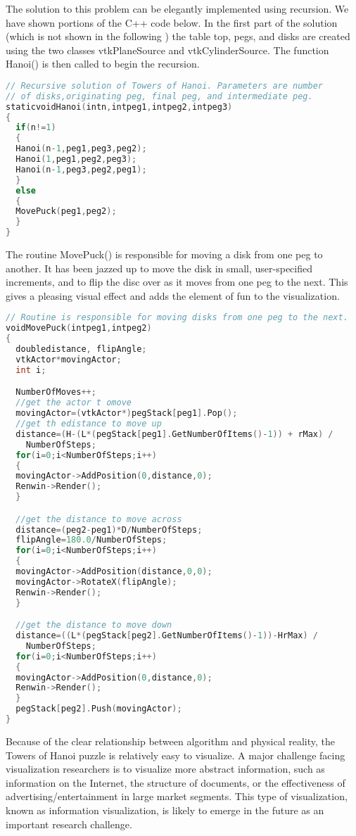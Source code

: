 The solution to this problem can be elegantly implemented using recursion. We have shown portions of the C++ code below.
In the first part of the solution (which is not shown in the following ) the table top, pegs, and disks are created using the two classes vtkPlaneSource and vtkCylinderSource. The function Hanoi() is then called to begin the recursion.

\begin{lstlisting}[language=C++, caption={Recursive solution for the Towers of Hanoi.}]
// Recursive solution of Towers of Hanoi. Parameters are number
// of disks,originating peg, final peg, and intermediate peg.
staticvoidHanoi(intn,intpeg1,intpeg2,intpeg3)
{
  if(n!=1)
  {
  Hanoi(n-1,peg1,peg3,peg2);
  Hanoi(1,peg1,peg2,peg3);
  Hanoi(n-1,peg3,peg2,peg1);
  }
  else
  {
  MovePuck(peg1,peg2);
  }
}
\end{lstlisting}

The routine MovePuck() is responsible for moving a disk from one peg to another. It has been jazzed up to move the disk in small, user-specified increments, and to flip the disc over as it moves from one peg to the next. This gives a pleasing visual effect and adds the element of fun to the visualization.

\begin{lstlisting}[language=C++, caption={Moving the puck.}]
// Routine is responsible for moving disks from one peg to the next.
voidMovePuck(intpeg1,intpeg2)
{
  doubledistance, flipAngle;
  vtkActor*movingActor;
  int i;

  NumberOfMoves++;
  //get the actor t omove
  movingActor=(vtkActor*)pegStack[peg1].Pop();
  //get th edistance to move up
  distance=(H-(L*(pegStack[peg1].GetNumberOfItems()-1)) + rMax) /
    NumberOfSteps;
  for(i=0;i<NumberOfSteps;i++)
  {
  movingActor->AddPosition(0,distance,0);
  Renwin->Render();
  }

  //get the distance to move across
  distance=(peg2-peg1)*D/NumberOfSteps;
  flipAngle=180.0/NumberOfSteps;
  for(i=0;i<NumberOfSteps;i++)
  {
  movingActor->AddPosition(distance,0,0);
  movingActor->RotateX(flipAngle);
  Renwin->Render();
  }

  //get the distance to move down
  distance=((L*(pegStack[peg2].GetNumberOfItems()-1))-HrMax) /
    NumberOfSteps;
  for(i=0;i<NumberOfSteps;i++)
  {
  movingActor->AddPosition(0,distance,0);
  Renwin->Render();
  }
  pegStack[peg2].Push(movingActor);
}
\end{lstlisting}

Because of the clear relationship between algorithm and physical reality, the Towers of Hanoi puzzle is relatively easy to visualize. A major challenge facing visualization researchers is to visualize more abstract information, such as information on the Internet, the structure of documents, or the effectiveness of advertising/entertainment in large market segments. This type of visualization, known as information visualization, is likely to emerge in the future as an important research challenge.

